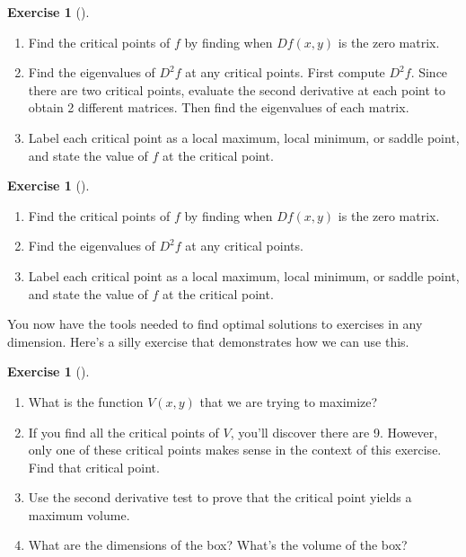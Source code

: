 \documentclass[10pt,]{book}
\theoremstyle{plain}
\theoremstyle{definition}
\theoremstyle{definition}
\theoremstyle{definition}
\theoremstyle{definition}
\newtheorem{exploration}[project]{Exercise}
\theoremstyle{definition}
\numberwithin{equation}{section}
\begin{document}
\begin{exploration}[]\label{exploration-236}
\leavevmode%
\begin{enumerate}[font=\bfseries,label=(\alph*),ref=\alph*]
\item\label{task-633} Find the critical points of \(f\) by finding when \(Df(x,y)\) is the zero matrix.%
\item\label{task-634} Find the eigenvalues of \(D^2f\) at any critical points. First compute \(D^2f\). Since there are two critical points, evaluate the second derivative at each point to obtain 2 different matrices. Then find the eigenvalues of each matrix.%
%
\item\label{task-635} Label each critical point as a local maximum, local minimum, or saddle point, and state the value of \(f\) at the critical point.%
\end{enumerate}
\end{exploration}
\begin{exploration}[]\label{exploration-237}
\leavevmode%
\begin{enumerate}[font=\bfseries,label=(\alph*),ref=\alph*]
\item\label{task-636} Find the critical points of \(f\) by finding when \(Df(x,y)\) is the zero matrix.%
\item\label{task-637} Find the eigenvalues of \(D^2f\) at any critical points.%
\item\label{task-638} Label each critical point as a local maximum, local minimum, or saddle point, and state the value of \(f\) at the critical point.%
\end{enumerate}
\end{exploration}
You now have the tools needed to find optimal solutions to exercises in any dimension. Here's a silly exercise that demonstrates how we can use this.%
\begin{exploration}[]\label{optimize_box_in_cake}
\leavevmode%
\begin{enumerate}[font=\bfseries,label=(\alph*),ref=\alph*]
\item\label{task-639} What is the function \(V(x,y)\) that we are trying to maximize?%
\item\label{task-640} If you find all the critical points of \(V\), you'll discover there are 9.  However, only one of these critical points makes sense in the context of this exercise. Find that critical point.%
\item\label{task-641} Use the second derivative test to prove that the critical point yields a maximum volume.%
\item\label{task-642} What are the dimensions of the box? What's the volume of the box?%
\end{enumerate}
\end{exploration}
\end{document}
